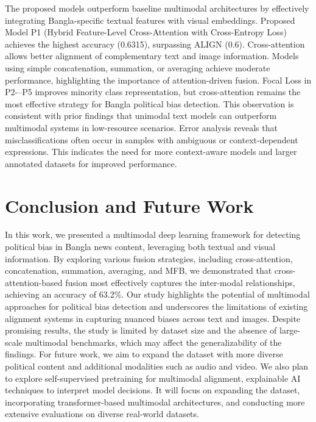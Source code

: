 \documentclass[11pt]{article}
\begin{document}
The proposed models outperform baseline multimodal architectures by effectively integrating Bangla-specific textual features with visual embeddings. Proposed Model P1 (Hybrid Feature-Level Cross-Attention with Cross-Entropy Loss) achieves the highest accuracy (0.6315), surpassing ALIGN (0.6). Cross-attention allows better alignment of complementary text and image information. Models using simple concatenation, summation, or averaging achieve moderate performance, highlighting the importance of attention-driven fusion. Focal Loss in P2-–P5 improves minority class representation, but cross-attention remains the most effective strategy for Bangla political bias detection. This observation is consistent with prior findings that unimodal text models can outperform multimodal systems in low-resource scenarios. Error analysis reveals that misclassifications often occur in samples with ambiguous or context-dependent expressions. This indicates the need for more context-aware models and larger annotated datasets for improved performance.



\section{Conclusion and Future Work}
In this work, we presented a multimodal deep learning framework for detecting political bias in Bangla news content, leveraging both textual and visual information. By exploring various fusion strategies, including cross-attention, concatenation, summation, averaging, and MFB, we demonstrated that cross-attention-based fusion most effectively captures the inter-modal relationships, achieving an accuracy of 63.2\%. Our study highlights the potential of multimodal approaches for political bias detection and underscores the limitations of existing alignment systems in capturing nuanced biases across text and images. Despite promising results, the study is limited by dataset size and the absence of large-scale multimodal benchmarks, which may affect the generalizability of the findings. For future work, we aim to expand the dataset with more diverse political content and additional modalities such as audio and video. We also plan to explore self-supervised pretraining for multimodal alignment, explainable AI techniques to interpret model decisions. It will focus on expanding the dataset, incorporating transformer-based multimodal architectures, and conducting more extensive evaluations on diverse real-world datasets.
\end{document}
